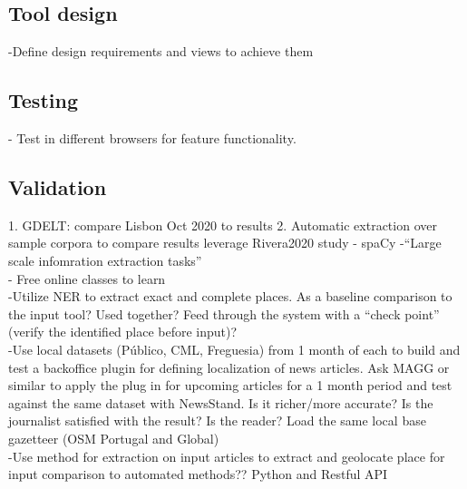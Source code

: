 \subsection{Tool design}
-{\color{red}Define design requirements and views to achieve them\cite{Zhang2019}}\\

\subsection{Testing}
- {\color{red}Test in different browsers for feature functionality.\cite{Shneiderman2020}}\\

\subsection{Validation}
1. GDELT: compare Lisbon Oct 2020 to results
2. Automatic extraction over sample corpora to compare results {\color{red} leverage Rivera2020 study}
- spaCy
-{\color{orange}``Large scale infomration extraction tasks''\cite{spaCy2020}}\\
-{\color{orange} Free online classes to learn\cite{spaCy2020}}\\
-{\color{purple}Utilize NER to extract exact and complete places.  As a baseline comparison to the input tool? Used together? Feed through the system with a “check point” (verify the identified place before input)?\cite{Gupta2020}}\\
-{\color{red}Use local datasets (Público, CML, Freguesia) from 1 month of each to build and test a backoffice plugin for defining localization of news articles. Ask MAGG or similar to apply the plug in for upcoming articles for a 1 month period and test against the same dataset with NewsStand. Is it richer/more accurate? Is the journalist satisfied with the result? Is the reader? Load the same local base gazetteer (OSM Portugal and Global)\cite{Lieberman2010}}\\
-{\color{red}Use method for extraction on input articles to extract and geolocate place for input comparison to automated methods?? Python and Restful API}\\
